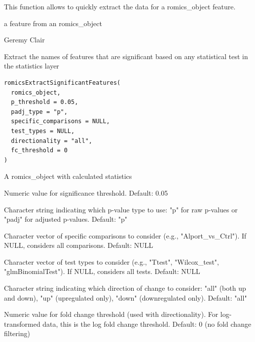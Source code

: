\documentclass[a4paper]{book}
\begin{document}
%
\begin{Details}
This function allows to quickly extract the data for a romics\_object feature.
\end{Details}
%
\begin{Value}
a feature from an romics\_object
\end{Value}
%
\begin{Author}
Geremy Clair
\end{Author}
%
\begin{Description}
Extract the names of features that are significant based on any statistical test in the statistics layer
\end{Description}
%
\begin{Usage}
\begin{verbatim}
romicsExtractSignificantFeatures(
  romics_object,
  p_threshold = 0.05,
  padj_type = "p",
  specific_comparisons = NULL,
  test_types = NULL,
  directionality = "all",
  fc_threshold = 0
)
\end{verbatim}
\end{Usage}
%
\begin{Arguments}
\begin{ldescription}
\item[\code{romics\_object}] A romics\_object with calculated statistics

\item[\code{p\_threshold}] Numeric value for significance threshold. Default: 0.05

\item[\code{padj\_type}] Character string indicating which p-value type to use: "p" for raw p-values or "padj" for adjusted p-values. Default: "p"

\item[\code{specific\_comparisons}] Character vector of specific comparisons to consider (e.g., "Alport\_vs\_Ctrl"). If NULL, considers all comparisons. Default: NULL

\item[\code{test\_types}] Character vector of test types to consider (e.g., "Ttest", "Wilcox\_test", "glmBinomialTest"). If NULL, considers all tests. Default: NULL

\item[\code{directionality}] Character string indicating which direction of change to consider: "all" (both up and down), "up" (upregulated only), "down" (downregulated only). Default: "all"

\item[\code{fc\_threshold}] Numeric value for fold change threshold (used with directionality). For log-transformed data, this is the log fold change threshold. Default: 0 (no fold change filtering)
\end{ldescription}
\end{Arguments}
\end{document}

